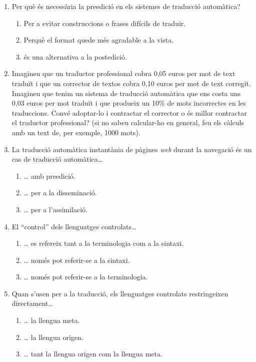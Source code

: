 \begin{enumerate}
\item Per què és necessària la preedició en els sistemes de traducció
  automàtica?
  \begin{enumerate}
  \item Per a evitar construccions o frases difícils de traduir.
  \item Perquè el format quede més agradable a la vista.
  \item és una alternativa a la postedició.
  \end{enumerate}

\item Imagineu que un traductor professional cobra 0,05 euros per mot
  de text traduït i que un corrector de textos cobra 0,10 euros per
  mot de text corregit. Imagineu que tenim un sistema de traducció
  automàtica que ens costa uns 0,03 euros per mot traduït i que
  produeix un 10\% de mots incorrectes en les traduccions. Convé
  adoptar-lo i contractar el corrector o és millor contractar el
  traductor professional? (si no sabeu calcular-ho en general, feu els
  càlculs amb un text de, per exemple, 1000 mots).

\item La traducció automàtica instantània de pàgines \emph{web} durant
  la navegació és un cas de traducció automàtica{\ldots}
  \begin{enumerate}
  \item {\ldots} amb preedició.
  \item {\ldots} per a la disseminació.
  \item {\ldots} per a l'assimilació.
\end{enumerate}

\item El ``control'' dels llenguatges controlats{\ldots}
  \begin{enumerate}
  \item {\ldots} es refereix tant a la terminologia com a la sintaxi.
  \item {\ldots} només pot referir-se a la sintaxi.
  \item {\ldots} només pot referir-se a la terminologia.
  \end{enumerate}

\item Quan s'usen per a la traducció, els llenguatges controlats
  restringeixen directament{\ldots}
  \begin{enumerate}
  \item {\ldots} la llengua meta.
  \item {\ldots} la llengua origen.
  \item {\ldots} tant la llengua origen com la llengua meta.
  \end{enumerate}


\end{enumerate}

